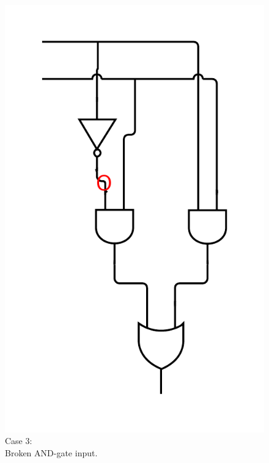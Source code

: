 \documentclass[10pt,a4paper]{scrartcl}
\begin{document}
\begin{figure}[h]
  \centering\includegraphics[width=\linewidth]{images/exercise_6_2_after_not.png}
  \caption{Case 3: \\Broken AND-gate input.}
  \endminipage\hfill

\end{figure}
\end{document}
